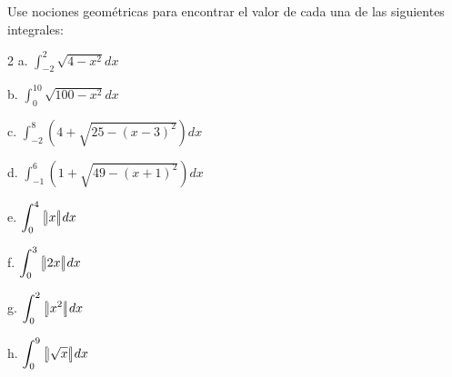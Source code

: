 \begin{ejer}{Use nociones geométricas para encontrar el valor de cada una de las siguientes integrales:}


\begin{multicols}{2}
a. $\displaystyle\int_{-2}^{2}\sqrt{4-x^{2}}dx$


b. $\displaystyle\int_{0}^{10}\sqrt{100-x^{2}}dx$


c. $\displaystyle\int_{-2}^{8}\left( 4+\sqrt{25-\left( x-3\right) ^{2}}\right) dx$


d. $\displaystyle\int_{-1}^{6}\left( 1+\sqrt{49-\left( x+1\right) ^{2}}\right) dx$


e. $\displaystyle\int_{0}^{4}\big[\hspace{-0.05cm}| x|\hspace{-0.07cm}\big] dx$


f. $\displaystyle\int_{0}^{3}\big[\hspace{-0.05cm}| 2x|\hspace{-0.07cm}\big] dx$


g. $\displaystyle\int_{0}^{2}\big[\hspace{-0.05cm}| x^2|\hspace{-0.07cm}\big] dx$


h. $\displaystyle\int_{0}^{9} \big[\hspace{-0.05cm}| \sqrt{x}|\hspace{-0.07cm}\big] dx$
\end{multicols}
\end{ejer}







